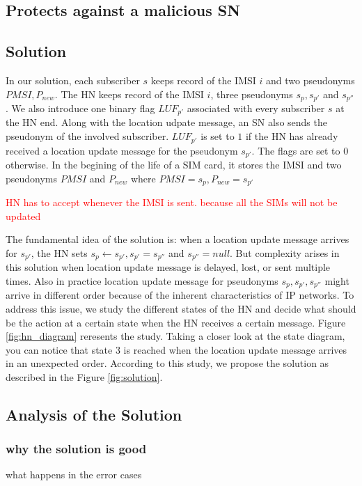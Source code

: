 \documentclass{llncs} %
\begin{document}
\subsection{Protects against a malicious SN}

\subsection{Solution}
In our solution, each subscriber $s$ keeps record of the IMSI $i$ and two pseudonyms $PMSI,P_{new}$. The HN keeps record of the IMSI $i$, three pseudonyms $s_p,s_{p'}$ and $s_{p''}$. We also introduce one binary flag $LUF_{p'}$ associated with every subscriber $s$ at the HN end. Along with the location udpate message, an SN also sends the pseudonym of the involved subscriber.  $LUF_{p'}$ is set to $1$ if the HN has already received a location update message for the pseudonym $s_{p'}$. The flags are set to $0$ otherwise. In the begining of the life of a SIM card, it stores the IMSI and two pseudonyms $PMSI$ and $P_{new}$ where $PMSI = s_p, P_{new} = s_{p'}$

\textcolor{red}{HN has to accept whenever the IMSI is sent. because all the SIMs will not be updated}

The fundamental idea of the solution is: when a location update message arrives for $s_{p'}$, the HN sets $s_p \leftarrow s_{p'}, s_{p'} = s_{p''}$ and $s_{p''} = null$. But complexity arises in this solution when location update message is delayed,  lost, or sent multiple times. Also in practice location update message for pseudonyms $s_{p},s_{p'},s_{p''}$ might arrive in different order because of the inherent characteristics of IP networks. To address this issue, we study the different states of  the HN and decide what should be the action at a certain state when the HN receives a certain message. Figure \ref{fig:hn_diagram} reresents the study. Taking a closer look at the state diagram, you can notice that state $3$ is reached when the location update message arrives in an unexpected order. According to this study, we propose the solution as described in the  Figure \ref{fig:solution}.







\subsection{Analysis of the Solution}
\subsubsection{why the solution is good}
what happens in the error cases
\end{document}
